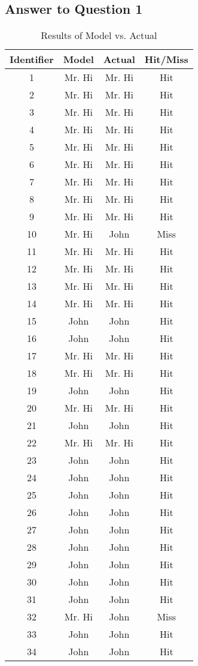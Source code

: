 \documentclass{article}
\begin{document}
\subsection*{Answer to Question 1}



\begin{table}[!h]
\centering

\begin{tabular}{c c c c}
\hline
Identifier & Model &  Actual & Hit/Miss \\
\hline
\hline
1 & Mr. Hi & Mr. Hi & Hit \\
2 & Mr. Hi & Mr. Hi & Hit \\
3 & Mr. Hi & Mr. Hi & Hit \\
4 & Mr. Hi & Mr. Hi & Hit \\
5 & Mr. Hi & Mr. Hi & Hit \\
6 & Mr. Hi & Mr. Hi & Hit \\
7 & Mr. Hi & Mr. Hi & Hit \\
8 & Mr. Hi & Mr. Hi & Hit \\
9 & Mr. Hi & Mr. Hi & Hit \\
10 & Mr. Hi & John & Miss \\
11 & Mr. Hi & Mr. Hi & Hit \\
12 & Mr. Hi & Mr. Hi & Hit \\
13 & Mr. Hi & Mr. Hi & Hit \\
14 & Mr. Hi & Mr. Hi & Hit \\
15 & John & John & Hit \\
16 & John & John & Hit \\
17 & Mr. Hi & Mr. Hi & Hit \\
18 & Mr. Hi & Mr. Hi & Hit \\
19 & John & John & Hit \\
20 & Mr. Hi & Mr. Hi & Hit \\
21 & John & John & Hit \\
22 & Mr. Hi & Mr. Hi & Hit \\
23 & John & John & Hit \\
24 & John & John & Hit \\
25 & John & John & Hit \\
26 & John & John & Hit \\
27 & John & John & Hit \\
28 & John & John & Hit \\
29 & John & John & Hit \\
30 & John & John & Hit \\
31 & John & John & Hit \\
32 & Mr. Hi & John & Miss \\
33 & John & John & Hit \\
34 & John & John & Hit \\
\hline
\end{tabular}
\caption{Results of Model vs. Actual}
\end{table}
\end{document}
